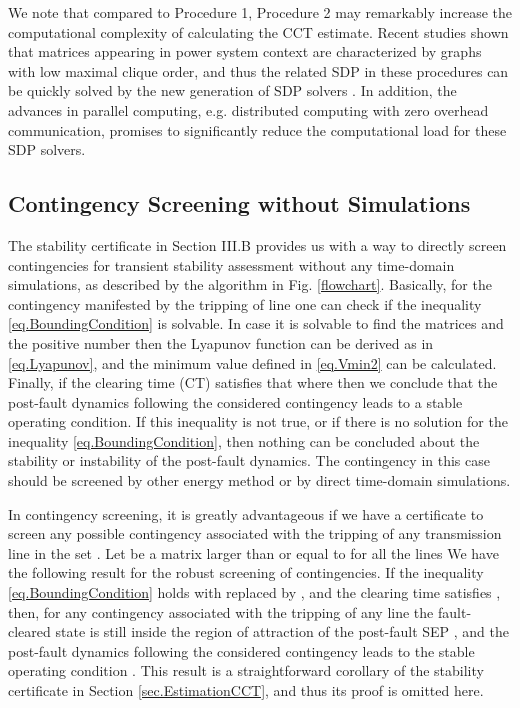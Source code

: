 \documentclass[final]{IEEEtran}
\begin{document}
We note that compared to Procedure 1, Procedure 2 may remarkably
increase the computational complexity of calculating the CCT
estimate. Recent studies shown that matrices appearing in power
system context are characterized by graphs with low maximal clique
order, and thus the related SDP in these procedures can be quickly
solved by the new generation of SDP solvers
\cite{Javadmadani2014sdp, Jabr2012}. In addition, the advances in
parallel computing, e.g. distributed computing with zero overhead
communication, promises to significantly reduce the computational
load for these SDP solvers.





\subsection{Contingency Screening without Simulations}


The stability certificate in Section III.B provides us with a way
to directly screen contingencies for transient stability
assessment without any time-domain simulations, as described by
the algorithm in Fig. \ref{flowchart}. Basically, for the
contingency manifested by the tripping of line  one can
check if the inequality \eqref{eq.BoundingCondition} is solvable.
In case it is solvable to find the matrices  and the
positive number  then the Lyapunov function  can be
derived as in \eqref{eq.Lyapunov}, and the minimum value
 defined in \eqref{eq.Vmin2} can be calculated. Finally,
if the clearing time (CT)  satisfies that
 where
 then we conclude that
the post-fault dynamics following the considered contingency leads
to a stable operating condition. If this inequality is not true,
or if there is no solution for the inequality
\eqref{eq.BoundingCondition}, then nothing can be concluded about
the stability or instability of the post-fault dynamics. The
contingency in this case should be screened by other energy method
or by direct time-domain simulations.






In contingency screening, it is greatly advantageous if we have a
certificate to screen any possible contingency associated with the
tripping of any transmission line in the set . Let  be a matrix larger than or equal to
 for all the lines  We have the following result for the robust
screening of contingencies. If the inequality
\eqref{eq.BoundingCondition} holds with 
replaced by , and the clearing time  satisfies
,  then, for any
contingency associated with the tripping of any line  the fault-cleared state  is
still inside the region of attraction of the post-fault SEP
, and the post-fault dynamics following the
considered contingency leads to the stable operating condition
. This result is a straightforward corollary of
the stability certificate in Section \ref{sec.EstimationCCT}, and
thus its proof is omitted here.
\end{document}
